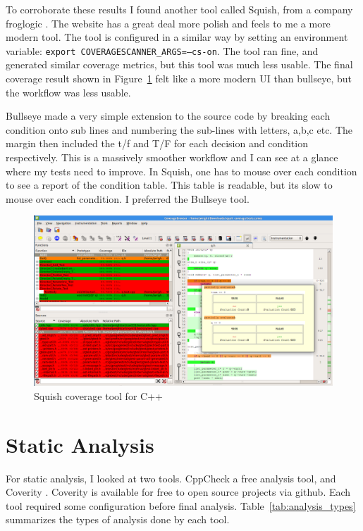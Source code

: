 \documentclass[12pt,journal]{article}
\begin{document}
To corroborate these results I found another tool called Squish, from a company
froglogic \autocite{_froglogic_????}. The website has a great deal more polish
and feels to me a more modern tool. The tool is configured in a similar way by
setting an environment variable: {\tt export COVERAGESCANNER\_ARGS=--cs-on}. The
tool ran fine, and generated similar coverage metrics, but this tool was much
less usable. The final coverage result shown in Figure~\ref{fig:squish_coverage}
felt like a more modern UI than bullseye, but the workflow was less usable. 

Bullseye made a very simple extension to the source code by breaking each
condition onto sub lines and numbering the sub-lines with letters, a,b,c etc. The
margin then included the t/f and T/F for each decision and condition
respectively. This is a massively smoother workflow and I can see at a glance
where my tests need to improve. In Squish, one has to mouse over each condition
to see a report of the condition table. This table is readable, but its slow to
mouse over each condition. I preferred the Bullseye tool.

\begin{figure}
    \centering
    \includegraphics[width=0.8\columnwidth]{Squish.png}
    \caption{Squish coverage tool for C++}
    \label{fig:squish_coverage}
\end{figure}

\section{Static Analysis}

For static analysis, I looked at two tools. CppCheck \autocite{_cppcheck_????}
a free analysis tool, and Coverity \autocite{_software_coverity}. Coverity is
available for free to open source projects via github.  Each tool required some
configuration before final analysis. Table~\ref{tab:analysis_types} summarizes
the types of analysis done by each tool.
\end{document}
